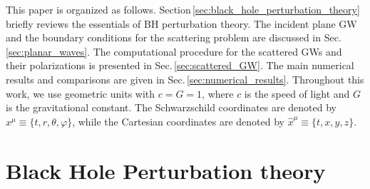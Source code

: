 \documentclass[reprint,amsmath,amssymb,aps,prd]{revtex4-2}
\begin{document}
This paper is organized as follows. Section\,\ref{sec:black_hole_perturbation_theory} briefly reviews the essentials of BH perturbation theory. The incident plane GW and the boundary conditions for the scattering problem are discussed in Sec.\,\ref{sec:planar_waves}. The computational procedure for the scattered GWs and their polarizations is presented in Sec.\,\ref{sec:scattered_GW}. The main numerical results and comparisons are given in Sec.\,\ref{sec:numerical_results}. Throughout this work, we use geometric units with $c=G=1$, where $c$ is the speed of light and $G$ is the gravitational constant. The Schwarzschild coordinates are denoted by $x^{\mu}\equiv\{t,r,\theta,\varphi\}$, while the Cartesian coordinates are denoted by $\hat{x}^{\mu}\equiv\{t,x,y,z\}$.

\section{\label{sec:black_hole_perturbation_theory}Black Hole Perturbation theory}
\end{document}
